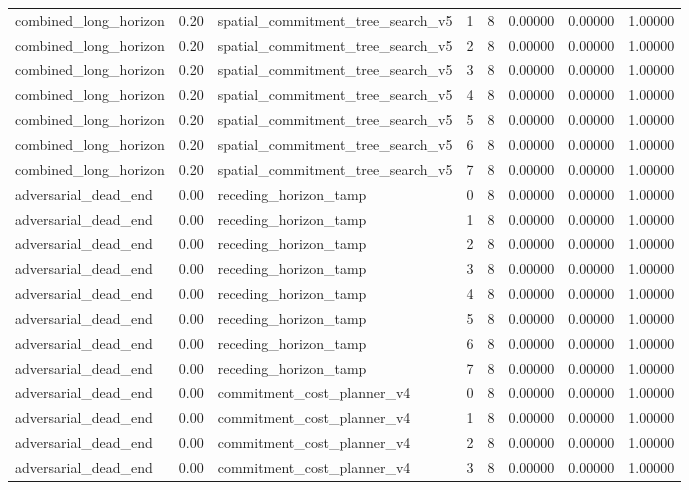 \documentclass{article}
\begin{document}
\begin{table}[tbp]
{\begin{tabular}{llllllll}
combined\_long\_horizon & 0.20 & spatial\_commitment\_tree\_search\_v5 & 1 & 8 & 0.00000 & 0.00000 & 1.00000 \\
combined\_long\_horizon & 0.20 & spatial\_commitment\_tree\_search\_v5 & 2 & 8 & 0.00000 & 0.00000 & 1.00000 \\
combined\_long\_horizon & 0.20 & spatial\_commitment\_tree\_search\_v5 & 3 & 8 & 0.00000 & 0.00000 & 1.00000 \\
combined\_long\_horizon & 0.20 & spatial\_commitment\_tree\_search\_v5 & 4 & 8 & 0.00000 & 0.00000 & 1.00000 \\
combined\_long\_horizon & 0.20 & spatial\_commitment\_tree\_search\_v5 & 5 & 8 & 0.00000 & 0.00000 & 1.00000 \\
combined\_long\_horizon & 0.20 & spatial\_commitment\_tree\_search\_v5 & 6 & 8 & 0.00000 & 0.00000 & 1.00000 \\
combined\_long\_horizon & 0.20 & spatial\_commitment\_tree\_search\_v5 & 7 & 8 & 0.00000 & 0.00000 & 1.00000 \\
adversarial\_dead\_end & 0.00 & receding\_horizon\_tamp & 0 & 8 & 0.00000 & 0.00000 & 1.00000 \\
adversarial\_dead\_end & 0.00 & receding\_horizon\_tamp & 1 & 8 & 0.00000 & 0.00000 & 1.00000 \\
adversarial\_dead\_end & 0.00 & receding\_horizon\_tamp & 2 & 8 & 0.00000 & 0.00000 & 1.00000 \\
adversarial\_dead\_end & 0.00 & receding\_horizon\_tamp & 3 & 8 & 0.00000 & 0.00000 & 1.00000 \\
adversarial\_dead\_end & 0.00 & receding\_horizon\_tamp & 4 & 8 & 0.00000 & 0.00000 & 1.00000 \\
adversarial\_dead\_end & 0.00 & receding\_horizon\_tamp & 5 & 8 & 0.00000 & 0.00000 & 1.00000 \\
adversarial\_dead\_end & 0.00 & receding\_horizon\_tamp & 6 & 8 & 0.00000 & 0.00000 & 1.00000 \\
adversarial\_dead\_end & 0.00 & receding\_horizon\_tamp & 7 & 8 & 0.00000 & 0.00000 & 1.00000 \\
adversarial\_dead\_end & 0.00 & commitment\_cost\_planner\_v4 & 0 & 8 & 0.00000 & 0.00000 & 1.00000 \\
adversarial\_dead\_end & 0.00 & commitment\_cost\_planner\_v4 & 1 & 8 & 0.00000 & 0.00000 & 1.00000 \\
adversarial\_dead\_end & 0.00 & commitment\_cost\_planner\_v4 & 2 & 8 & 0.00000 & 0.00000 & 1.00000 \\
adversarial\_dead\_end & 0.00 & commitment\_cost\_planner\_v4 & 3 & 8 & 0.00000 & 0.00000 & 1.00000 \\
\bottomrule
\end{tabular}
}
\end{table}
\end{document}
